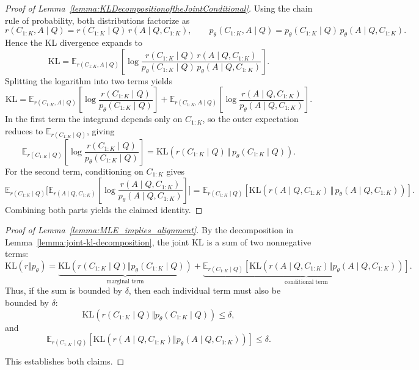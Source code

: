 \documentclass{article}
\begin{document}
\begin{proof}[Proof of Lemma~\ref{lemma:KLDecompositionoftheJointConditional}]
Using the chain rule of probability, both distributions factorize as
\[
r(C_{1:K},A\mid Q)
= r(C_{1:K}\mid Q)\, r(A\mid Q,C_{1:K}),
\qquad
p_\theta(C_{1:K},A\mid Q)
= p_\theta(C_{1:K}\mid Q)\, p_\theta(A\mid Q,C_{1:K}).
\]
Hence the KL divergence expands to
\[
\mathrm{KL}
= 
\mathbb{E}_{r(C_{1:K},A\mid Q)}
\left[
\log \frac{
r(C_{1:K}\mid Q)\, r(A\mid Q,C_{1:K})
}{
p_\theta(C_{1:K}\mid Q)\, p_\theta(A\mid Q,C_{1:K})
}
\right].
\]
Splitting the logarithm into two terms yields
\[
\mathrm{KL}
=
\mathbb{E}_{r(C_{1:K},A\mid Q)}
\!\left[
\log\frac{r(C_{1:K}\mid Q)}{p_\theta(C_{1:K}\mid Q)}
\right]
+
\mathbb{E}_{r(C_{1:K},A\mid Q)}
\!\left[
\log\frac{r(A\mid Q,C_{1:K})}{p_\theta(A\mid Q,C_{1:K})}
\right].
\]
In the first term the integrand depends only on $C_{1:K}$, so the outer expectation reduces to
$\mathbb{E}_{r(C_{1:K}\mid Q)}$, giving
\[
\mathbb{E}_{r(C_{1:K}\mid Q)}
\left[
\log\frac{r(C_{1:K}\mid Q)}{p_\theta(C_{1:K}\mid Q)}
\right]
= 
\mathrm{KL}\!\left(r(C_{1:K}\mid Q)\,\Vert\,p_\theta(C_{1:K}\mid Q)\right).
\]
For the second term, conditioning on $C_{1:K}$ gives
\[
\mathbb{E}_{r(C_{1:K}\mid Q)}
\!\Big[
\mathbb{E}_{r(A\mid Q,C_{1:K})}
\left[
\log\frac{r(A\mid Q,C_{1:K})}{p_\theta(A\mid Q,C_{1:K})}
\right]
\Big]
=
\mathbb{E}_{r(C_{1:K}\mid Q)}
\!\left[
\mathrm{KL}\!\left(r(A\mid Q,C_{1:K}) \,\Vert\, p_\theta(A\mid Q,C_{1:K})\right)
\right].
\]
Combining both parts yields the claimed identity.
\end{proof}

\begin{proof}[Proof of Lemma~\ref{lemma:MLE_implies_alignment}]
By the decomposition in Lemma~\ref{lemma:joint-kl-decomposition},
the joint KL is a sum of two nonnegative terms:
\[
\mathrm{KL}(r\Vert p_\theta)
=
\underbrace{
\mathrm{KL}\!\left(r(C_{1:K}\mid Q)\Vert p_\theta(C_{1:K}\mid Q)\right)
}_{\text{marginal term}}
+
\underbrace{
\mathbb{E}_{r(C_{1:K}\mid Q)} 
\left[
\mathrm{KL}\!\left(r(A\mid Q,C_{1:K})\Vert p_\theta(A\mid Q,C_{1:K})\right)
\right]
}_{\text{conditional term}}.
\]
Thus, if the sum is bounded by $\delta$, then each individual term must also be bounded by
$\delta$:
\[
\mathrm{KL}\!\left(
r(C_{1:K}\mid Q)
\Vert
p_\theta(C_{1:K}\mid Q)
\right)
\le \delta,
\]
and
\[
\mathbb{E}_{r(C_{1:K}\mid Q)}
\!\left[
\mathrm{KL}\!\left(
r(A\mid Q,C_{1:K})
\Vert
p_\theta(A\mid Q,C_{1:K})
\right)
\right]
\le \delta.
\]

This establishes both claims.
\end{proof}
\end{document}
